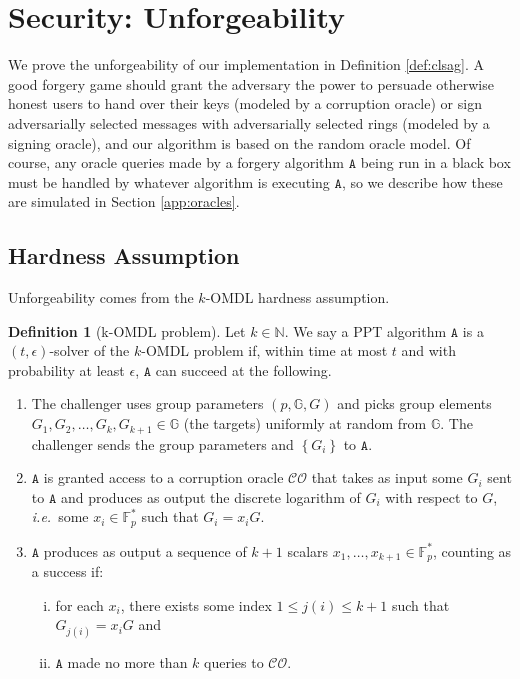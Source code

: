 \documentclass{mrl}
\theoremstyle{plain}
\theoremstyle{definition}
\newtheorem{definition}{Definition}[section]
\begin{document}
\section{Security: Unforgeability}\label{app:unf}
We prove the unforgeability of our implementation in Definition \ref{def:clsag}. A good forgery game should grant the adversary the power to persuade otherwise honest users to hand over their keys (modeled by a corruption oracle) or sign adversarially selected messages with adversarially selected rings (modeled by a signing oracle), and our algorithm is based on the random oracle model. Of course, any oracle queries made by a forgery algorithm $\texttt{A}$ being run in a black box must be handled by whatever algorithm is executing $\texttt{A}$, so we describe how these are simulated in Section \ref{app:oracles}.


\subsection{Hardness Assumption}
Unforgeability comes from the $k$-OMDL hardness assumption. 

\begin{definition}[k-OMDL problem]
Let $k \in \mathbb{N}$. We say a PPT algorithm $\texttt{A}$ is a $(t, \epsilon)$-solver of the $k$-OMDL problem if, within time at most $t$ and with probability at least $\epsilon$, $\texttt{A}$ can succeed at the following.

\begin{enumerate}
\item The challenger uses group parameters $(p, \mathbb{G}, G)$ and picks group elements $G_1, G_2, \ldots, G_{k}, G_{k+1} \in \mathbb{G}$ (the targets) uniformly at random from $\mathbb{G}$. The challenger sends the group parameters and $\left\{G_i\right\}$ to $\texttt{A}$.

\item $\texttt{A}$ is granted access to a corruption oracle $\mathcal{CO}$ that takes as input some $G_i$ sent to $\texttt{A}$ and produces as output the discrete logarithm of $G_i$ with respect to $G$, \textit{i.e.}\ some $x_i \in \mathbb{F}_p^*$ such that $G_i = x_i G$.

\item $\texttt{A}$ produces as output a sequence of $k+1$ scalars $x_1, \ldots, x_{k+1} \in \mathbb{F}_p^*$, counting as a success if:
\begin{enumerate}[(i)]
\item for each $x_i$, there exists some index $1 \leq j(i) \leq k+1$ such that $G_{j(i)} = x_iG$ and
\item $\texttt{A}$ made no more than $k$ queries to $\mathcal{CO}$. 
\end{enumerate}
\end{enumerate}
\end{definition}
\end{document}
